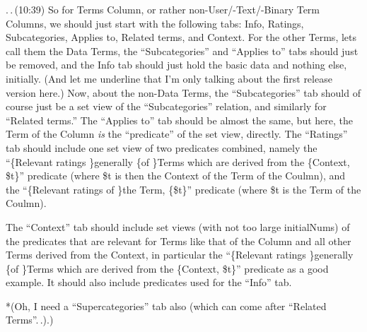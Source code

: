 \documentclass{report}
\begin{document}
.\,.\,(10:39) So for Terms Column, or rather non-User/-Text/-Binary Term Columns, we should just start with the following tabs: Info, Ratings, Subcategories, Applies to, Related terms, and Context. For the other Terms, lets call them the Data Terms, the ``Subcategories'' and ``Applies to'' tabs should just be removed, and the Info tab should just hold the basic data and nothing else, initially. (And let me underline that I'm only talking about the first release version here.) Now, about the non-Data Terms, the ``Subcategories'' tab should of course just be a set view of the ``Subcategories'' relation, and similarly for ``Related terms.'' The ``Applies to'' tab should be almost the same, but here, the Term of the Column \emph{is} the ``predicate'' of the set view, directly.  The ``Ratings'' tab should include one set view of two predicates combined, namely the ``\{Relevant ratings \}generally \{of \}Terms which are derived from the \{Context, \$t\}'' predicate (where \$t is then the Context of the Term of the Coulmn), and the ``\{Relevant ratings of \}the Term, \{\$t\}'' predicate (where \$t is the Term of the Coulmn).

The ``Context'' tab should include set views (with not too large initialNums) of the predicates that are relevant for Terms like that of the Column and all other Terms derived from the Context, in particular the ``\{Relevant ratings \}generally \{of \}Terms which are derived from the \{Context, \$t\}'' predicate as a good example. It should also include predicates used for the ``Info'' tab.

*(Oh, I need a ``Supercategories'' tab also (which can come after ``Related Terms''.\,.).)
\end{document}

